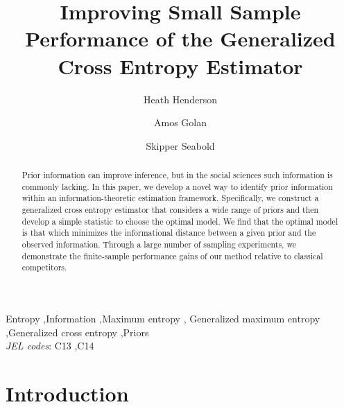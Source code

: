 \documentclass{elsarticle}
\begin{document}
\begin{frontmatter}

\title{Improving Small Sample Performance of the Generalized Cross 
Entropy Estimator}

\author[hh]{Heath Henderson}
\author[ag]{Amos Golan}
\author[ss]{Skipper Seabold}

\address[hh]{Department of Economics, Iowa State University}
\address[ag]{Department of Economics, American University}
\address[ss]{Department of Economics, American University}

\begin{abstract}
Prior information can improve inference, but in the social sciences such
information is commonly lacking.
In this paper, we develop a novel way to identify prior information within 
an information-theoretic estimation framework. 
Specifically, we construct a generalized cross entropy estimator that considers a 
wide range of priors and then develop a simple statistic to choose the optimal 
model. 
We find that the optimal model is that which minimizes the informational 
distance between a given prior and the observed information. 
Through a large number of sampling experiments, we demonstrate the 
finite-sample performance gains of our method relative to classical competitors.
\end{abstract}

\begin{keyword}
Entropy \sep Information \sep Maximum entropy \sep 
Generalized maximum entropy \sep Generalized cross entropy \sep Priors \\
\textit{JEL codes}: C13 \sep C14  
\end{keyword}

\end{frontmatter}

\doublespacing


\section{Introduction}
\label{sec: intro}
\end{document}

